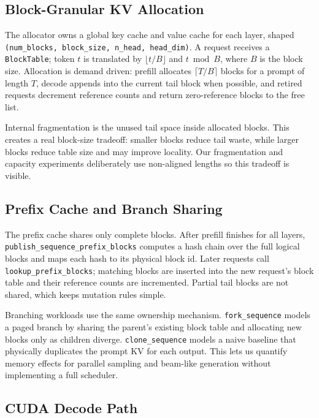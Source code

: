 \documentclass{article}
\begin{document}
\subsection{Block-Granular KV Allocation}

The allocator owns a global key cache and value cache for each layer, shaped \texttt{(num\_blocks, block\_size, n\_head, head\_dim)}.  A request receives a \texttt{BlockTable}; token \(t\) is translated by \(\lfloor t/B\rfloor\) and \(t \bmod B\), where \(B\) is the block size.  Allocation is demand driven: prefill allocates \(\lceil T/B\rceil\) blocks for a prompt of length \(T\), decode appends into the current tail block when possible, and retired requests decrement reference counts and return zero-reference blocks to the free list.

Internal fragmentation is the unused tail space inside allocated blocks.  This creates a real block-size tradeoff: smaller blocks reduce tail waste, while larger blocks reduce table size and may improve locality.  Our fragmentation and capacity experiments deliberately use non-aligned lengths so this tradeoff is visible.

\subsection{Prefix Cache and Branch Sharing}

The prefix cache shares only complete blocks.  After prefill finishes for all layers, \texttt{publish\_sequence\_prefix\_blocks} computes a hash chain over the full logical blocks and maps each hash to its physical block id.  Later requests call \texttt{lookup\_prefix\_blocks}; matching blocks are inserted into the new request's block table and their reference counts are incremented.  Partial tail blocks are not shared, which keeps mutation rules simple.

Branching workloads use the same ownership mechanism.  \texttt{fork\_sequence} models a paged branch by sharing the parent's existing block table and allocating new blocks only as children diverge.  \texttt{clone\_sequence} models a naive baseline that physically duplicates the prompt KV for each output.  This lets us quantify memory effects for parallel sampling and beam-like generation without implementing a full scheduler.

\subsection{CUDA Decode Path}
\end{document}
